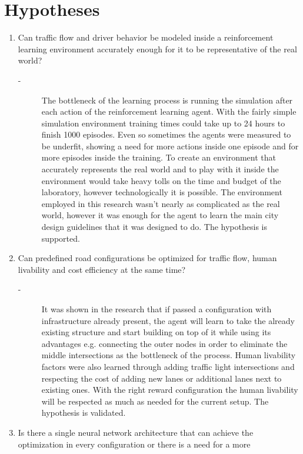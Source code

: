 \documentclass[
]{elteikthesis}[2023/04/10]
\begin{document}
\section*{Hypotheses}
\begin{enumerate}
\item Can traffic flow and driver behavior be modeled inside a reinforcement
learning environment accurately enough for it to be representative
of the real world?
\begin{description}
\item [{-}] The bottleneck of the learning process is running the simulation
after each action of the reinforcement learning agent. With the fairly
simple simulation environment training times could take up to 24 hours
to finish 1000 episodes. Even so sometimes the agents were measured
to be underfit, showing a need for more actions inside one episode
and for more episodes inside the training. To create an environment
that accurately represents the real world and to play with it inside
the environment would take heavy tolls on the time and budget of the
laboratory, however technologically it is possible. The environment
employed in this research wasn't nearly as complicated as the real
world, however it was enough for the agent to learn the main city
design guidelines that it was designed to do. The hypothesis is supported. 
\end{description}
\item Can predefined road configurations be optimized for traffic flow,
human livability and cost efficiency at the same time? 
\begin{description}
\item [{-}] It was shown in the research that if passed a configuration
with infrastructure already present, the agent will learn to take
the already existing structure and start building on top of it while
using its advantages e.g. connecting the outer nodes in order to eliminate
the middle intersections as the bottleneck of the process. Human livability
factors were also learned through adding traffic light intersections
and respecting the cost of adding new lanes or additional lanes next
to existing ones. With the right reward configuration the human livability
will be respected as much as needed for the current setup. The hypothesis
is validated.
\end{description}
\item Is there a single neural network architecture that can achieve the
optimization in every configuration or there is a need for a more

\end{enumerate}
\end{document}
